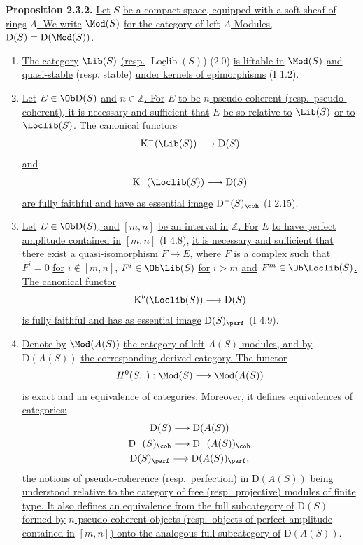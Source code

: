 \textbf{Proposition 2.3.2.} \uline{Let} $S$ \uline{be a compact space, equipped with a soft sheaf of rings} $A$\uline{. We write} $\Mod(S)$ \uline{for the category of left} $A$\uline{-Modules,} $\mathrm D(S)=\mathrm D(\Mod(S))$.
\begin{enumerate}[label=\alph*)]
\item \uline{The category} $\Lib(S)$ \uline{(resp.} $\underline{\operatorname{Loclib}}(S)$) (2.0) \uline{is liftable in} $\Mod(S)$ \uline{and quasi-stable} (resp. stable) \uline{under kernels of epimorphisms} (I 1.2).
\item \uline{Let} $E\in\Ob\mathrm D(S)$ \uline{and} $n\in\mathbb Z$\uline{. For} $E$ \uline{to be} $n$\uline{-pseudo-coherent (resp.\ pseudo-coherent), it is necessary and sufficient that} $E$ \uline{be so relative to} $\Lib(S)$ \uline{or to} $\Loclib(S)$\uline{. The canonical functors}
\[
\mathrm K^{-}(\Lib(S))\longrightarrow \mathrm D(S)
\]
\uline{and}
\[
\mathrm K^{-}(\Loclib(S))\longrightarrow \mathrm D(S)
\]
\uline{are fully faithful and have as essential image} $\mathrm D^{-}(S)_{\coh}$ (I 2.15).
\item \uline{Let} $E\in\Ob\mathrm D(S)$\uline{, and} $[m,n]$ \uline{be an interval in} $\mathbb Z$\uline{. For} $E$ \uline{to have perfect amplitude contained in} $[m,n]$ (I 4.8), \uline{it is necessary and sufficient that there exist a quasi-isomorphism} $F\to E$\uline{, where} $F$ \uline{is a complex such that} $F^i=0$ \uline{for} $i\notin[m,n]$, $F^i\in\Ob\Lib(S)$ \uline{for} $i>m$ \uline{and} $F^m\in\Ob\Loclib(S)$\uline{. The canonical functor}
\[
\mathrm K^b(\Loclib(S))\longrightarrow\mathrm D(S)
\]
\uline{is fully faithful and has as essential image} $\mathrm D(S)_{\parf}$ (I 4.9).
\item \uline{Denote by} $\Mod(A(S))$ \uline{the category of left} $A(S)$\uline{-modules, and by} $\mathrm D(A(S))$ \uline{the corresponding derived category. The functor}
\[
H^0(S,.):\Mod(S)\longrightarrow\Mod(A(S))
\]
\uline{is exact and an equivalence of categories. Moreover, it
defines}
%
\uline{equivalences of categories:}
\[
\begin{gathered}
\mathrm D(S)\longrightarrow\mathrm D(A(S))\\
\mathrm D^{-}(S)_{\coh}\longrightarrow\mathrm D^{-}(A(S))_{\coh}\\
\mathrm D(S)_{\parf}\longrightarrow\mathrm D(A(S))_{\parf},
\end{gathered}
\]
\uline{the notions of pseudo-coherence (resp.\ perfection) in} $\mathrm D(A(S))$ \uline{being understood relative to the category of free (resp.\ projective) modules of finite type. It also defines an equivalence from the full subcategory of} $\mathrm D(S)$ \uline{formed by} $n$\uline{-pseudo-coherent objects (resp.\ objects of perfect amplitude contained in} $[m,n]$\uline{) onto the analogous full subcategory of} $\mathrm D(A(S))$.
\end{enumerate}

